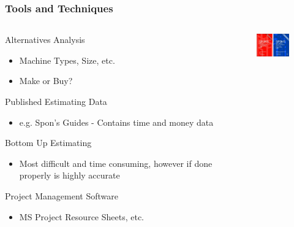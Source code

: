 \begin{frame}
\frametitle{Tools and Techniques} 

\begin{columns}
\begin{column}{0.7\textwidth}
Alternatives Analysis
\begin{itemize}
	\item Machine Types, Size, etc.
	\item Make or Buy?
\end{itemize}
Published Estimating Data
\begin{itemize}
	\item e.g. Spon's Guides - Contains time and money data
\end{itemize}
Bottom Up Estimating
\begin{itemize}
	\item Most difficult and time consuming, however if done properly is highly accurate
\end{itemize}	
Project Management Software 
\begin{itemize}
	\item MS Project Resource Sheets, etc. 
\end{itemize}
\end{column}

\begin{column}{0.3\textwidth}
\begin{figure}
	\centering
		\includegraphics[width = 3cm]{images/sponbooks.jpg}
	\label{fig:sponbooks}
\end{figure}
\end{column}
\end{columns}
\end{frame}




